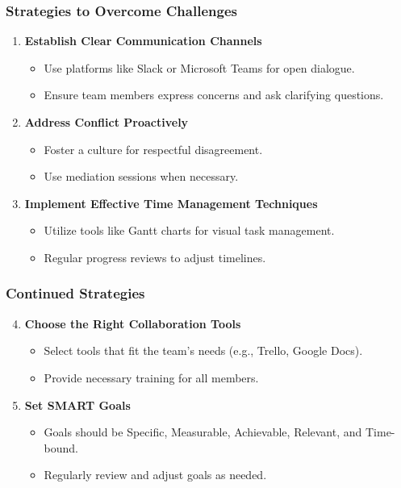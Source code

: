 \documentclass[aspectratio=169]{beamer}
\begin{document}
\begin{frame}[fragile]
    \frametitle{Strategies to Overcome Challenges}
    \begin{enumerate}
        \item \textbf{Establish Clear Communication Channels}
            \begin{itemize}
                \item Use platforms like Slack or Microsoft Teams for open dialogue.
                \item Ensure team members express concerns and ask clarifying questions.
            \end{itemize}
        \item \textbf{Address Conflict Proactively}
            \begin{itemize}
                \item Foster a culture for respectful disagreement.
                \item Use mediation sessions when necessary.
            \end{itemize}
        \item \textbf{Implement Effective Time Management Techniques}
            \begin{itemize}
                \item Utilize tools like Gantt charts for visual task management.
                \item Regular progress reviews to adjust timelines.
            \end{itemize}
    \end{enumerate}
\end{frame}

\begin{frame}[fragile]
    \frametitle{Continued Strategies}
    \begin{enumerate}
        \setcounter{enumi}{3} %
        \item \textbf{Choose the Right Collaboration Tools}
            \begin{itemize}
                \item Select tools that fit the team's needs (e.g., Trello, Google Docs).
                \item Provide necessary training for all members.
            \end{itemize}
        \item \textbf{Set SMART Goals}
            \begin{itemize}
                \item Goals should be Specific, Measurable, Achievable, Relevant, and Time-bound.
                \item Regularly review and adjust goals as needed.
            \end{itemize}
    \end{enumerate}
\end{frame}
\end{document}
